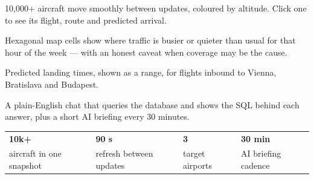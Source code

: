 \documentclass[10.5pt]{article}
\begin{document}
\vspace{0.55cm}
\begin{minipage}[t]{0.485\linewidth}
\begin{darkcard}
{\color{accent}\Large\faPlane}

\vspace{2pt}
{\small 10,000+ aircraft move smoothly between updates, coloured by altitude. Click one to see its flight, route and predicted arrival.}
\end{darkcard}
\end{minipage}\hfill
\begin{minipage}[t]{0.485\linewidth}
\begin{darkcard}
{\color{violet}\Large\faLayerGroup}

\vspace{2pt}
{\small Hexagonal map cells show where traffic is busier or quieter than usual for that hour of the week — with an honest caveat when coverage may be the cause.}
\end{darkcard}
\end{minipage}

\vspace{4pt}
\begin{minipage}[t]{0.485\linewidth}
\begin{darkcard}
{\color{accent}\Large\faClock}

\vspace{2pt}
{\small Predicted landing times, shown as a range, for flights inbound to Vienna, Bratislava and Budapest.}
\end{darkcard}
\end{minipage}\hfill
\begin{minipage}[t]{0.485\linewidth}
\begin{darkcard}
{\color{violet}\Large\faComments}

\vspace{2pt}
{\small A plain-English chat that queries the database and shows the SQL behind each answer, plus a short AI briefing every 30 minutes.}
\end{darkcard}
\end{minipage}

\vspace{8pt}
\begin{center}
\begin{tabular}{@{}p{3.4cm} p{3.4cm} p{3.4cm} p{3.4cm}@{}}
{\color{accent}\fontsize{20}{23}\selectfont\bfseries 10k+} & {\color{accent}\fontsize{20}{23}\selectfont\bfseries 90 s} & {\color{accent}\fontsize{20}{23}\selectfont\bfseries 3} & {\color{accent}\fontsize{20}{23}\selectfont\bfseries 30 min} \\
{\color{muted}\scriptsize aircraft in one snapshot} & {\color{muted}\scriptsize refresh between updates} & {\color{muted}\scriptsize target airports} & {\color{muted}\scriptsize AI briefing cadence} \\
\end{tabular}
\end{center}
\end{document}
